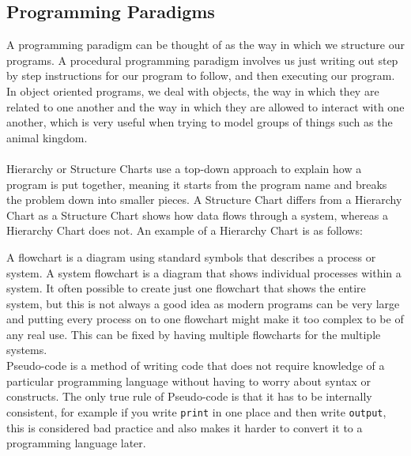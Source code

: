 \subsection{Programming Paradigms}
  \noindent
  A programming paradigm can be thought of as the way in which we structure our programs. A procedural programming paradigm involves us just writing out step by step instructions for our program to follow, and then executing our program. In object oriented programs, we deal with objects, the way in which they are related to one another and the way in which they are allowed to interact with one another, which is very useful when trying to model groups of things such as the animal kingdom.\\ \\
  \noindent
  Hierarchy or Structure Charts use a top-down approach to explain how a program is put together, meaning it starts from the program name and breaks the problem down into smaller pieces. A Structure Chart differs from a Hierarchy Chart as a Structure Chart shows how data flows through a system, whereas a Hierarchy Chart does not. An example of a Hierarchy Chart is as follows:
  \begin{figure}[H]
    \centering
  \end{figure}
  \noindent
  A flowchart is a diagram using standard symbols that describes a process or system. A system flowchart is a diagram that shows individual processes within a system. It often possible to create just one flowchart that shows the entire system, but this is not always a good idea as modern programs can be very large and putting every process on to one flowchart might make it too complex to be of any real use. This can be fixed by having multiple flowcharts for the multiple systems.\\
  Pseudo-code is a method of writing code that does not require knowledge of a particular programming language without having to worry about syntax or constructs. The only true rule of Pseudo-code is that it has to be internally consistent, for example if you write \verb|print| in one place and then write \verb|output|, this is considered bad practice and also makes it harder to convert it to a programming language later.\\
